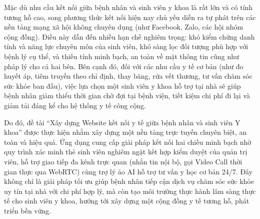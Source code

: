 \documentclass[a4paper,13pt]{extreport}
\begin{document}
Mặc dù nhu cầu kết nối giữa bệnh nhân và sinh viên y khoa là rất lớn và có tính tương hỗ cao, song phương thức kết nối hiện nay chủ yếu diễn ra tự phát trên các nền tảng mạng xã hội không chuyên dụng (như Facebook, Zalo, các hội nhóm cộng đồng). Điều này dẫn đến nhiều hạn chế nghiêm trọng: khó kiểm chứng danh tính và năng lực chuyên môn của sinh viên, khó sàng lọc đối tượng phù hợp với bệnh lý cụ thể, và thiếu tính minh bạch, an toàn về mặt thông tin cũng như pháp lý cho cả hai bên. Bên cạnh đó, đối với các nhu cầu y tế cơ bản (như đo huyết áp, tiêm truyền theo chỉ định, thay băng, rửa vết thương, tư vấn chăm sóc sức khỏe ban đầu), việc lựa chọn một sinh viên y khoa hỗ trợ tại nhà sẽ giúp bệnh nhân giảm thiểu thời gian chờ đợi tại bệnh viện, tiết kiệm chi phí đi lại và giảm tải đáng kể cho hệ thống y tế công cộng.

Do đó, đề tài ``Xây dựng Website kết nối y tế giữa bệnh nhân và sinh viên Y khoa'' được thực hiện nhằm xây dựng một nền tảng trực tuyến chuyên biệt, an toàn và hiệu quả. Ứng dụng cung cấp giải pháp kết nối hai chiều minh bạch nhờ quy trình xác minh thẻ sinh viên nghiêm ngặt kết hợp kiểm duyệt của quản trị viên, hỗ trợ giao tiếp đa kênh trực quan (nhắn tin nội bộ, gọi Video Call thời gian thực qua WebRTC) cùng trợ lý ảo AI hỗ trợ tư vấn y học cơ bản 24/7. Đây không chỉ là giải pháp tối ưu giúp bệnh nhân tiếp cận dịch vụ chăm sóc sức khỏe uy tín tại nhà với chi phí hợp lý, mà còn tạo môi trường thực hành lâm sàng thực tế cho sinh viên y khoa, hướng tới xây dựng một cộng đồng y tế tương hỗ, phát triển bền vững.
\end{document}
